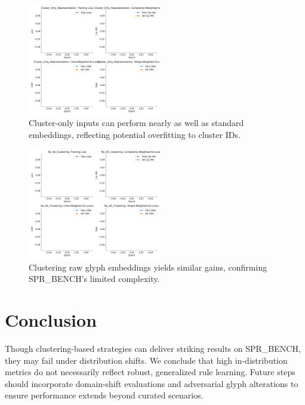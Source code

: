 \documentclass{article} %
\theoremstyle{plain}
\theoremstyle{definition}
\theoremstyle{remark}
\begin{document}
\begin{figure}[t!]
\centering
\includegraphics[width=0.52\textwidth]{Cluster_Only_Representation_Aggregated.png}
\caption{Cluster-only inputs can perform nearly as well as standard embeddings, reflecting potential overfitting to cluster IDs.}
\label{fig:cluster_only}
\end{figure}

\begin{figure}[t!]
\centering
\includegraphics[width=0.52\textwidth]{No_AE_Clustering_Aggregated.png}
\caption{Clustering raw glyph embeddings yields similar gains, confirming SPR\_BENCH's limited complexity.}
\label{fig:no_ae_clustering}
\end{figure}

\section{Conclusion}
Though clustering-based strategies can deliver striking results on SPR\_BENCH, they may fail under distribution shifts. We conclude that high in-distribution metrics do not necessarily reflect robust, generalized rule learning. Future steps should incorporate domain-shift evaluations and adversarial glyph alterations to ensure performance extends beyond curated scenarios.



\end{document}
